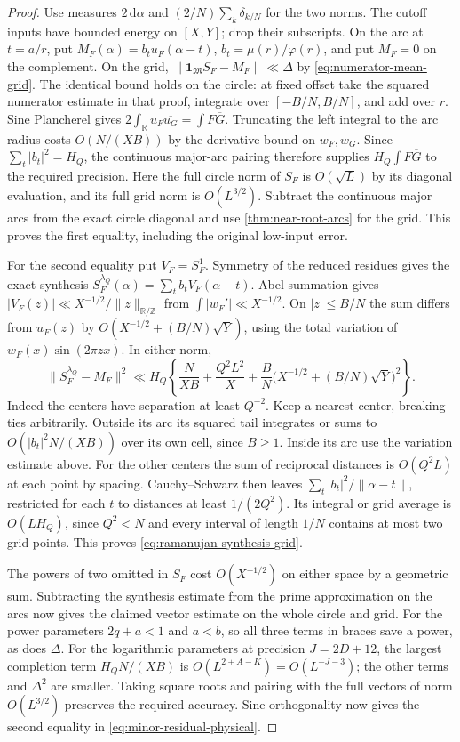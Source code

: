 \documentclass[11pt,a4paper]{article}
\numberwithin{equation}{section}
\newcommand{\ud}{\mathrm d}
\begin{document}
\begin{proof}
Use measures $2\,\ud\alpha$ and $(2/N)\sum_k\delta_{k/N}$ for
the two norms. The cutoff inputs have bounded energy on $[X,Y]$;
drop their subscripts. On the arc at $t=a/r$, put
$M_F(\alpha)=b_t u_F(\alpha-t)$, $b_t=\mu(r)/\varphi(r)$,
and put $M_F=0$ on the complement. On the grid,
$\|\mathbf1_{\mathfrak M}S_F-M_F\|\ll\Delta$ by
\eqref{eq:numerator-mean-grid}. The identical bound holds on the
circle: at fixed offset take the squared numerator estimate in
that proof, integrate over $[-B/N,B/N]$, and add over $r$.
Sine Plancherel gives
$2\int_{\mathbb R}u_F\overline{u_G}=\int F\overline G$.
Truncating the left integral to the arc radius costs
$O(N/(XB))$ by the derivative bound on $w_F,w_G$. Since
$\sum_t |b_t|^2=H_Q$, the continuous major-arc pairing therefore
supplies $H_Q\int F\overline G$ to the required precision.
Here the full circle norm of $S_F$ is $O(\sqrt L)$ by its
diagonal evaluation, and its full grid norm is $O(L^{3/2})$.
Subtract the continuous major arcs from the exact circle
diagonal and use \cref{thm:near-root-arcs} for the grid. This
proves the first equality, including the original low-input error.

For the second equality put $V_F=S_F^1$. Symmetry of the
reduced residues gives the exact synthesis
$S_F^{\lambda_Q}(\alpha)=\sum_t b_t V_F(\alpha-t)$.
Abel summation gives $|V_F(z)|\ll X^{-1/2}/\|z\|_{\mathbb R/\mathbb Z}$
from $\int |w_F'|\ll X^{-1/2}$. On $|z|\le B/N$ the sum
differs from $u_F(z)$ by $O(X^{-1/2}+(B/N)\sqrt Y)$, using
the total variation of $w_F(x)\sin(2\pi zx)$. In either norm,
\begin{equation}
 \|S_F^{\lambda_Q}-M_F\|^2
 \ll H_Q\left\{\frac{N}{XB}+\frac{Q^2L^2}{X}
        +\frac BN\big(X^{-1/2}+(B/N)\sqrt Y\big)^2\right\}.
 \label{eq:ramanujan-synthesis-grid}
\end{equation}
Indeed the centers have separation at least $Q^{-2}$. Keep a
nearest center, breaking ties arbitrarily. Outside its arc its
squared tail integrates or sums to $O(|b_t|^2N/(XB))$ over
its own cell, since $B\ge1$. Inside its arc use the variation
estimate above. For the other centers the sum of reciprocal
distances is $O(Q^2L)$ at each point by spacing. Cauchy--Schwarz
then leaves $\sum_t |b_t|^2/\|\alpha-t\|$, restricted for
each $t$ to distances at least $1/(2Q^2)$. Its integral or
grid average is $O(LH_Q)$, since $Q^2<N$ and every interval
of length $1/N$ contains at most two grid points. This proves
\eqref{eq:ramanujan-synthesis-grid}.

The powers of two omitted in $S_F$ cost $O(X^{-1/2})$ on
either space by a geometric sum. Subtracting the synthesis
estimate from the prime approximation on the arcs now gives
the claimed vector estimate on the whole circle and grid.
For the power parameters $2q+a<1$ and $a<b$, so all three
terms in braces save a power, as does $\Delta$. For the
logarithmic parameters at precision $J=2D+12$, the largest
completion term $H_Q N/(XB)$ is $O(L^{2+A-K})=O(L^{-J-3})$;
the other terms and $\Delta^2$ are smaller. Taking square
roots and pairing with the full vectors of norm $O(L^{3/2})$
preserves the required accuracy. Sine orthogonality now gives
the second equality in \eqref{eq:minor-residual-physical}.
\end{proof}
\end{document}
